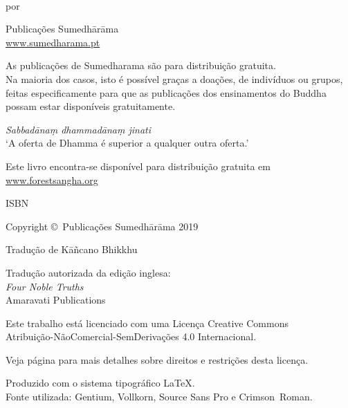 \cleartoverso
\thispagestyle{empty}

{\copyrightsize
\centering
\setlength{\parindent}{0pt}%
\setlength{\parskip}{0.8\baselineskip}%

\thetitle\\
por \theauthor


Publicações Sumedhārāma\\
\href{http://sumedharama.pt}{www.sumedharama.pt}

As publicações de Sumedharama são para distribuição gratuita.\\ 
Na maioria dos casos, isto é possível graças a doações, de indivíduos ou grupos,
feitas especificamente para que as publicações dos ensinamentos do Buddha possam
estar disponíveis gratuitamente.

\textit{Sabbadānaṃ dhammadānaṃ jinati}\\
`A oferta de Dhamma é superior a qualquer outra oferta.'

Este livro encontra-se disponível para distribuição gratuita em\\
\href{https://forestsangha.org/}{www.forestsangha.org}

ISBN \theISBN

Copyright \copyright\ Publicações Sumedhārāma 2019

Tradução de Kāñcano Bhikkhu

Tradução autorizada da edição inglesa:\\
\emph{Four Noble Truths}\\
Amaravati Publications

\vfill

{\footnotesize

Este trabalho está licenciado com uma Licença Creative Commons\\
Atribuição-NãoComercial-SemDerivações 4.0 Internacional.

Veja página \pageref{copyright-details} para mais detalhes sobre direitos e restrições desta licença.

Produzido com o sistema tipográfico \LaTeX.\\
Fonte utilizada: Gentium, Vollkorn, Source Sans Pro e Crimson~Roman.

\theEditionInfo

}}
